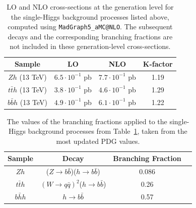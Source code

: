 \documentclass[11pt,a4paper]{article}
\begin{document}
\begin{itemize}
  \begin{table}[h]
\begin{center}
\begin{tabular}{|c|c|c|c|}
\hline
Sample & LO & NLO & K-factor\\
\hline\hline
$Zh$ (13 TeV) & $6.5 \cdot 10^{-1}$ pb & $ 7.7 \cdot 10^{-1}$ pb & 1.19 \\
$t\bar{t}h$ (13 TeV) & $3.8 \cdot 10^{-1}$ pb & $4.6 \cdot 10^{-1}$ pb & 1.29 \\
$b\bar{b}h$ (13 TeV) &  $4.9 \cdot 10^{-1}$ pb & $6.1 \cdot 10^{-1}$ pb & 1.22 \\
\hline
\end{tabular}
\caption{\small LO and NLO cross-sections at the generation level for the single-Higgs background
  processes listed above, computed using {\tt MadGraph5\_aMC@NLO}.
  The subsequent decays and the corresponding branching fractions are not included in these generation-level cross-sections. \label{HK}
}
\end{center}
  \end{table}%

  \begin{table}[h]
\begin{center}
\begin{tabular}{|c|c|c|c|}
\hline
Sample & Decay & Branching Fraction\\
\hline\hline
$Zh$ & ($Z\to b\bar{b}$)($h\to b\bar{b}$) & 0.086 \\
$t\bar{t}h$ & $(W\to q\bar{q})^2$($h\to b\bar{b}$) & 0.26 \\
$b\bar{h}h$ & $h\to b\bar{b}$ & 0.57 \\
\hline
\end{tabular}
\caption{\small The values of the branching fractions applied to the single-Higgs
background processes from Table~\ref{HK}, taken from the most updated PDG values. \label{HBF}}
\end{center}
  \end{table}%


\end{itemize}
\end{document}
